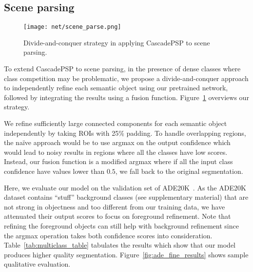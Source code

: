 \documentclass[10pt,twocolumn,letterpaper]{article}
\begin{document}
\subsection{Scene parsing}
\begin{figure}
\centering
\texttt{[image: net/scene\_parse.png]}
\caption{Divide-and-conquer strategy in applying CascadePSP to scene parsing.}
\label{fig:scene_parsing}
\vspace{-0.3in}
\end{figure}


To extend CascadePSP to scene parsing, in the presence of dense classes where class competition may be problematic, we propose a divide-and-conquer approach to independently refine each semantic object using our pretrained network, followed by integrating the results using a fusion function. Figure~\ref{fig:scene_parsing} overviews our strategy. 

We refine sufficiently large connected components for each semantic object independently by taking ROIs with 25\% padding. 
To handle overlapping regions, the na\"ive approach would be to use argmax on the output confidence which would lead to noisy results in regions where all the classes have low scores.
Instead, our fusion function is a modified argmax where if all the input class confidence have values lower than $0.5$, we fall back to the original segmentation. 

Here, we evaluate our model on the validation set of ADE20K~\cite{zhou2017scene}. 
As the ADE20K dataset contains ``stuff'' background classes (see supplementary material) that are not strong in objectness and too different from our training data, we have attenuated their output scores to focus on foreground refinement.
Note that refining the foreground objects can still help with background refinement since the argmax operation takes both confidence scores into consideration.
Table~\ref{tab:multiclass_table} tabulates the results which show that our model produces higher quality segmentation. Figure~\ref{fig:ade_fine_results} shows sample qualitative evaluation.
\end{document}

